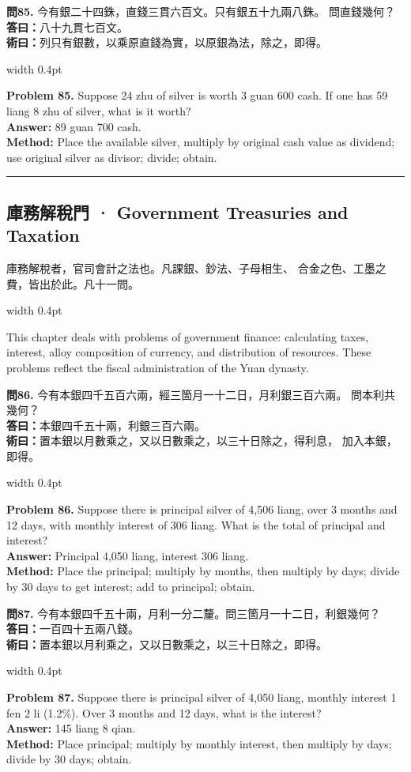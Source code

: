 \documentclass[10pt,a4paper]{article}
\newcommand{\longline}{\noindent\rule{\textwidth}{0.3pt}}
\newlength{\cnwidth}
\newlength{\enwidth}
\newcommand{\bilingual}[2]{%
  \noindent%
  \begin{minipage}[t]{\cnwidth}%
    #1%
  \end{minipage}%
  \hfill\vrule width 0.4pt\hfill%
  \begin{minipage}[t]{\enwidth}%
    #2%
  \end{minipage}%
  \par\smallskip%
}
\newcommand{\bilingualsubsection}[2]{%
  \subsection*{#1 · #2}
}
\begin{document}
\bilingual{%
  \textbf{問85.}
  今有銀二十四銖，直錢三貫六百文。只有銀五十九兩八銖。
  問直錢幾何？\\
  \textbf{答曰：}八十九貫七百文。\\
  \textbf{術曰：}列只有銀數，以乘原直錢為實，以原銀為法，除之，即得。
}{%
  \textbf{Problem 85.}
  Suppose 24 zhu of silver is worth 3 guan 600 cash.
  If one has 59 liang 8 zhu of silver, what is it worth?\\
  \textbf{Answer:} 89 guan 700 cash.\\
  \textbf{Method:} Place the available silver, multiply by original cash value as
  dividend; use original silver as divisor; divide; obtain.
}

\longline

\bilingualsubsection{庫務解稅門}{Government Treasuries and Taxation}
\label{sec:kuwu}

\bilingual{%
  庫務解稅者，官司會計之法也。凡課銀、鈔法、子母相生、
  合金之色、工墨之費，皆出於此。凡十一問。
}{%
  This chapter deals with problems of government finance: calculating
  taxes, interest, alloy composition of currency, and distribution of resources.
  These problems reflect the fiscal administration of the Yuan dynasty.
}

\bilingual{%
  \textbf{問86.}
  今有本銀四千五百六兩，經三箇月一十二日，月利銀三百六兩。
  問本利共幾何？\\
  \textbf{答曰：}本銀四千五十兩，利銀三百六兩。\\
  \textbf{術曰：}置本銀以月數乘之，又以日數乘之，以三十日除之，得利息，
  加入本銀，即得。
}{%
  \textbf{Problem 86.}
  Suppose there is principal silver of 4,506 liang, over 3 months and 12 days,
  with monthly interest of 306 liang. What is the total of principal and interest?\\
  \textbf{Answer:} Principal 4,050 liang, interest 306 liang.\\
  \textbf{Method:} Place the principal; multiply by months, then multiply by days;
  divide by 30 days to get interest; add to principal; obtain.
}

\bilingual{%
  \textbf{問87.}
  今有本銀四千五十兩，月利一分二釐。問三箇月一十二日，利銀幾何？\\
  \textbf{答曰：}一百四十五兩八錢。\\
  \textbf{術曰：}置本銀以月利乘之，又以日數乘之，以三十日除之，即得。
}{%
  \textbf{Problem 87.}
  Suppose there is principal silver of 4,050 liang, monthly interest 1 fen 2 li
  (1.2\%). Over 3 months and 12 days, what is the interest?\\
  \textbf{Answer:} 145 liang 8 qian.\\
  \textbf{Method:} Place principal; multiply by monthly interest, then multiply by
  days; divide by 30 days; obtain.
}
\end{document}
